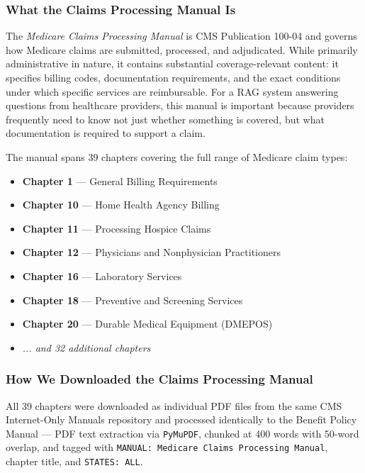 \documentclass[10pt, letterpaper]{article}
\begin{document}
\subsubsection{What the Claims Processing Manual Is}
 
The \textit{Medicare Claims Processing Manual} is CMS Publication 100-04 and governs
how Medicare claims are submitted, processed, and adjudicated. While primarily
administrative in nature, it contains substantial coverage-relevant content: it
specifies billing codes, documentation requirements, and the exact conditions under
which specific services are reimbursable. For a RAG system answering questions from
healthcare providers, this manual is important because providers frequently need to
know not just whether something is covered, but what documentation is required to
support a claim.
 
The manual spans 39 chapters covering the full range of Medicare claim types:
 
\begin{itemize}[noitemsep, topsep=4pt]
    \item \textbf{Chapter 1} --- General Billing Requirements
    \item \textbf{Chapter 10} --- Home Health Agency Billing
    \item \textbf{Chapter 11} --- Processing Hospice Claims
    \item \textbf{Chapter 12} --- Physicians and Nonphysician Practitioners
    \item \textbf{Chapter 16} --- Laboratory Services
    \item \textbf{Chapter 18} --- Preventive and Screening Services
    \item \textbf{Chapter 20} --- Durable Medical Equipment (DMEPOS)
    \item \textit{... and 32 additional chapters}
\end{itemize}
 
\subsubsection{How We Downloaded the Claims Processing Manual}
 
All 39 chapters were downloaded as individual PDF files from the same CMS Internet-Only
Manuals repository and processed identically to the Benefit Policy Manual --- PDF text
extraction via \texttt{PyMuPDF}, chunked at 400 words with 50-word overlap, and tagged
with \texttt{MANUAL: Medicare Claims Processing Manual}, chapter title, and
\texttt{STATES: ALL}.
 
\end{document}
